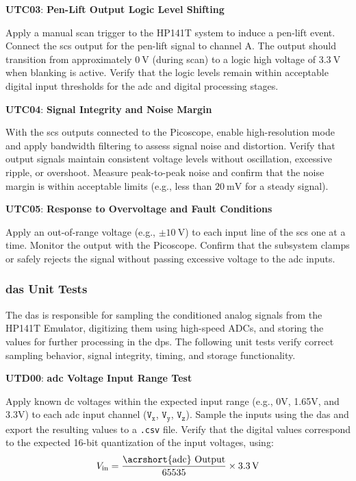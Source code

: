 \documentclass[class=report,11pt,crop=false]{standalone}
\begin{document}
	\begin{center}
		\textbf{UTC03}: \textbf{Pen-Lift Output Logic Level Shifting}
	\end{center}
	Apply a manual scan trigger to the HP141T system to induce a pen-lift event. Connect the \acrshort{scs} output for the pen-lift signal to channel A. The output should transition from approximately $\SI{0}{\volt}$ (during scan) to a logic high voltage of $\SI{3.3}{\volt}$ when blanking is active. Verify that the logic levels remain within acceptable digital input thresholds for the \acrshort{adc} and digital processing stages.
	
	\begin{center}
		\textbf{UTC04}: \textbf{Signal Integrity and Noise Margin}
	\end{center}
	With the \acrshort{scs} outputs connected to the Picoscope, enable high-resolution mode and apply bandwidth filtering to assess signal noise and distortion. Verify that output signals maintain consistent voltage levels without oscillation, excessive ripple, or overshoot. Measure peak-to-peak noise and confirm that the noise margin is within acceptable limits (e.g., less than $\SI{20}{\milli\volt}$ for a steady signal).
	
	\begin{center}
		\textbf{UTC05}: \textbf{Response to Overvoltage and Fault Conditions}
	\end{center}
	Apply an out-of-range voltage (e.g., $\pm\SI{10}{\volt}$) to each input line of the \acrshort{scs} one at a time. Monitor the output with the Picoscope. Confirm that the subsystem clamps or safely rejects the signal without passing excessive voltage to the \acrshort{adc} inputs.
	
	\subsubsection{\acrlong{das} Unit Tests}
	The \acrshort{das} is responsible for sampling the conditioned analog signals from the HP141T Emulator, digitizing them using high-speed ADCs, and storing the values for further processing in the \acrshort{dps}. The following unit tests verify correct sampling behavior, signal integrity, timing, and storage functionality.
	
	\begin{center}
		\textbf{UTD00}: \textbf{\acrshort{adc} Voltage Input Range Test}
	\end{center}
	Apply known \acrshort{dc} voltages within the expected input range (e.g., 0V, 1.65V, and 3.3V) to each \acrshort{adc} input channel ($\texttt{V}_\texttt{x}$, $\texttt{V}_\texttt{y}$, $\texttt{V}_\texttt{z}$). Sample the inputs using the \acrshort{das} and export the resulting values to a \texttt{.csv} file. Verify that the digital values correspond to the expected 16-bit quantization of the input voltages, using:
	\[
	V_{\text{in}} = \frac{\text{\acrshort{adc} Output}}{65535} \times \SI{3.3}{\volt}
	\]
	
\end{document}

